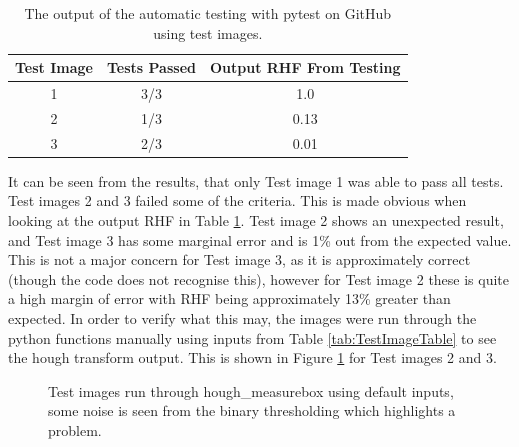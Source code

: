\documentclass{article}
\begin{document}
\begin{table}[h]
    \centering
    \begin{tabular}{|c|c|c|}
    \hline
        \textbf{Test Image} & \textbf{Tests Passed} & \textbf{Output RHF From Testing}  \\
        \hline
        1 & 3/3 & 1.0 \\
        \hline
        2 & 1/3 & 0.13 \\
        \hline
        3 & 2/3 & 0.01 \\
        \hline
    \end{tabular}
    \caption{The output of the automatic testing with pytest on GitHub using test images.}
    \label{TestResults}
\end{table}

It can be seen from the results, that only Test image 1 was able to pass all tests. Test images 2 and 3 failed some of the criteria. This is made obvious when looking at the output RHF in Table \ref{TestResults}. Test image 2 shows an unexpected result, and Test image 3 has some marginal error and is 1\% out from the expected value. This is not a major concern for Test image 3, as it is approximately correct (though the code does not recognise this), however for Test image 2 these is quite a high margin of error with RHF being approximately 13\% greater than expected. In order to verify what this may, the images were run through the python functions manually using inputs from Table \ref{tab:TestImageTable} to see the hough transform output. This is shown in Figure \ref{TestImagesProcessed} for Test images 2 and 3.

\begin{figure}
    \centering
    \hfill
    \caption{Test images run through hough\_measurebox using default inputs, some noise is seen from the binary thresholding which highlights a problem.}
    \label{TestImagesProcessed}
\end{figure}
\end{document}

